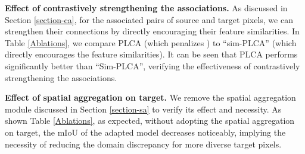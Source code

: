 \textbf{Effect of contrastively strengthening the associations.}
As discussed in Section \ref{section-ca}, for the associated pairs of source and target pixels, 
we can strengthen their connections by directly 
encouraging their feature similarities.
In Table \ref{Ablations},
we compare PLCA (which penalizes ) to 
``sim-PLCA'' (which directly encourages the feature similarities). 
It can be seen that PLCA performs significantly better than ``Sim-PLCA'',
verifying the effectiveness of contrastively strengthening the associations.

\textbf{Effect of spatial aggregation on target.}
We remove the spatial aggregation module discussed in Section \ref{section-sa} to verify its effect and necessity.
As shown Table \ref{Ablations}, as expected, without adopting the spatial aggregation on target, 
the mIoU of the adapted model decreases noticeably, implying the necessity of 
reducing the domain discrepancy for more diverse target pixels.








